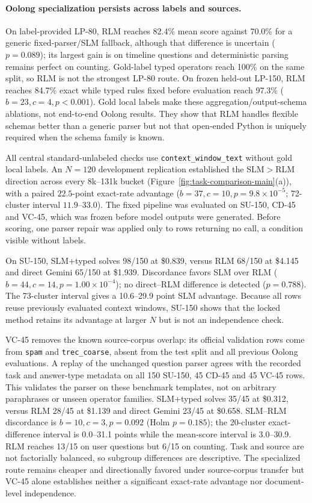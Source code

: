 \documentclass{article}
\begin{document}
\paragraph{Oolong specialization persists across labels and sources.}
On label-provided LP-80, RLM reaches 82.4\% mean score against 70.0\% for a generic fixed-parser/SLM fallback, although that difference is uncertain ($p{=}0.089$); its largest gain is on timeline questions and deterministic parsing remains perfect on counting. Gold-label typed operators reach 100\% on the same split, so RLM is not the strongest LP-80 route. On frozen held-out LP-150, RLM reaches 84.7\% exact while typed rules fixed before evaluation reach 97.3\% ($b{=}23,c{=}4,p{<}0.001$). Gold local labels make these aggregation/output-schema ablations, not end-to-end Oolong results. They show that RLM handles flexible schemas better than a generic parser but not that open-ended Python is uniquely required when the schema family is known.

All central standard-unlabeled checks use \texttt{context\_window\_text} without gold local labels. An $N{=}120$ development replication established the SLM$>$RLM direction across every 8k--131k bucket (Figure~\ref{fig:task-comparison-main}(a)), with a paired $22.5$-point exact-rate advantage ($b{=}37,c{=}10,p{=}9.8{\times}10^{-5}$; 72-cluster interval $11.9$--$33.0$). The fixed pipeline was evaluated on SU-150, CD-45 and VC-45, which was frozen before model outputs were generated. Before scoring, one parser repair was applied only to rows returning no call, a condition visible without labels.

On SU-150, SLM+typed solves 98/150 at \$0.839, versus RLM 68/150 at \$4.145 and direct Gemini 65/150 at \$1.939. Discordance favors SLM over RLM ($b{=}44,c{=}14,p{=}1.00{\times}10^{-4}$); no direct--RLM difference is detected ($p{=}0.788$). The 73-cluster interval gives a 10.6--29.9 point SLM advantage. Because all rows reuse previously evaluated context windows, SU-150 shows that the locked method retains its advantage at larger $N$ but is not an independence check.

VC-45 removes the known source-corpus overlap: its official validation rows come from \texttt{spam} and \texttt{trec\_coarse}, absent from the test split and all previous Oolong evaluations. A replay of the unchanged question parser agrees with the recorded task and answer-type metadata on all 150 SU-150, 45 CD-45 and 45 VC-45 rows. This validates the parser on these benchmark templates, not on arbitrary paraphrases or unseen operator families. SLM+typed solves 35/45 at \$0.312, versus RLM 28/45 at \$1.139 and direct Gemini 23/45 at \$0.658. SLM--RLM discordance is $b{=}10,c{=}3,p{=}0.092$ (Holm $p{=}0.185$); the 20-cluster exact-difference interval is 0.0--31.1 points while the mean-score interval is 3.0--30.9. RLM reaches 13/15 on user questions but 6/15 on counting. Task and source are not factorially balanced, so subgroup differences are descriptive. The specialized route remains cheaper and directionally favored under source-corpus transfer but VC-45 alone establishes neither a significant exact-rate advantage nor document-level independence.
\end{document}
